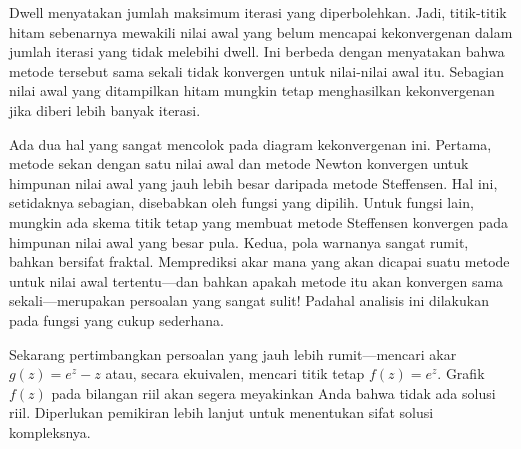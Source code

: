 Dwell menyatakan jumlah maksimum iterasi yang diperbolehkan. Jadi,
titik-titik hitam sebenarnya mewakili nilai awal yang belum mencapai
kekonvergenan dalam jumlah iterasi yang tidak melebihi dwell. Ini
berbeda dengan menyatakan bahwa metode tersebut sama sekali tidak
konvergen untuk nilai-nilai awal itu. Sebagian nilai awal yang ditampilkan
hitam mungkin tetap menghasilkan kekonvergenan jika diberi lebih banyak
iterasi.

Ada dua hal yang sangat mencolok pada diagram kekonvergenan ini. Pertama,
metode sekan dengan satu nilai awal dan metode Newton konvergen untuk
himpunan nilai awal yang jauh lebih besar daripada metode Steffensen.
Hal ini, setidaknya sebagian, disebabkan oleh fungsi yang dipilih.
Untuk fungsi lain, mungkin ada skema titik tetap yang membuat metode
Steffensen konvergen pada himpunan nilai awal yang besar pula. Kedua,
pola warnanya sangat rumit, bahkan bersifat fraktal. Memprediksi akar
mana yang akan dicapai suatu metode untuk nilai awal tertentu---dan
bahkan apakah metode itu akan konvergen sama sekali---merupakan persoalan
yang sangat sulit! Padahal analisis ini dilakukan pada fungsi yang
cukup sederhana.

Sekarang pertimbangkan persoalan yang jauh lebih rumit---mencari
akar $g(z)=e^{z}-z$ atau, secara ekuivalen, mencari titik tetap $f(z)=e^{z}$.
Grafik $f(z)$ pada bilangan riil akan segera meyakinkan Anda bahwa
tidak ada solusi riil. Diperlukan pemikiran lebih lanjut untuk menentukan
sifat solusi kompleksnya.

